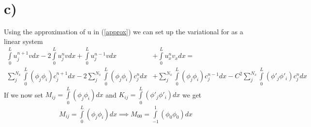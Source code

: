 \documentclass[a4paper,english, 10pt, twoside]{article}
\begin{document}
\section*{c)}
Using the approximation of u in (\ref{approx}) we can set up the variational for as a linear system
\begin{align*}
 \int\limits_0^Lu_j^{n+1}vdx -2\int\limits_0^Lu_j^nvdx + \int\limits_0^Lu_j^{n-1}vdx &+ \int\limits_0^Lu_x^nv_xdx    = \\
\sum\limits_j^{N_x}\int\limits_0^L(\phi_j\phi_i)c_j^{n+1}dx - 2\sum\limits_j^{N_x}\int\limits_0^L(\phi_j\phi_i)c_j^{n}dx &+ 
  \sum\limits_j^{N_x}\int\limits_0^L(\phi_j\phi_i)c_j^{n-1}dx - C^2\sum\limits_j^{N_x}\int\limits_0^L(\phi'_j\phi'_i)c_j^{n}dx
\end{align*}
If we now set $M_{ij} = \int\limits_0^L(\phi_j\phi_i)dx$ and $K_{ij} = \int\limits_0^L(\phi'_j\phi'_i)dx $ we get
\begin{align*}
M_{ij} = \int\limits_0^L(\phi_j\phi_i)dx \implies M_{00} = \int\limits_{-1}^1(\phi_0\phi_0)dx
\end{align*}
\end{document}
